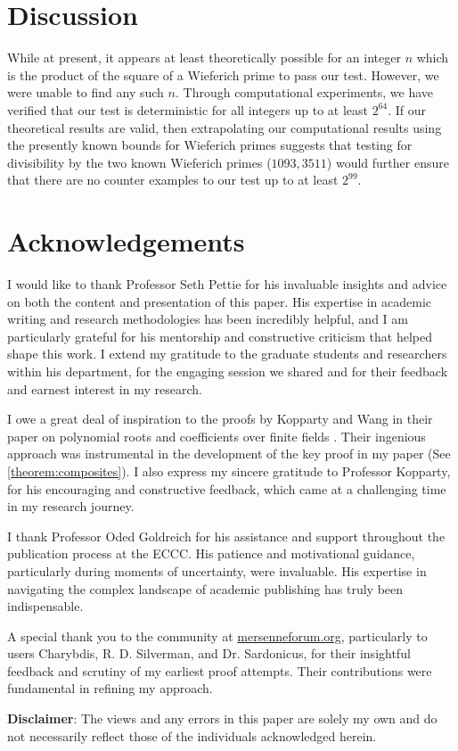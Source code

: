 \documentclass{article}
\theoremstyle{plain}
\theoremstyle{definition}
\begin{document}
\section{Discussion}
While at present, it appears at least theoretically possible for an integer $n$ which is the product of the square of a Wieferich prime to pass our test. However, we were unable to find any such $n$. Through computational experiments, we have verified that our test is deterministic for all integers up to at least $2^{64}$. If our theoretical results are valid, then extrapolating our computational results using the presently known bounds for Wieferich primes \cite{carella2018results} suggests that testing for divisibility by the two known Wieferich primes ($1093, 3511$) would further ensure that there are no counter examples to our test up to at least $2^{99}$.

\section{Acknowledgements}
I would like to thank Professor Seth Pettie for his invaluable insights and advice on both the content and presentation of this paper. His expertise in academic writing and research methodologies has been incredibly helpful, and I am particularly grateful for his mentorship and constructive criticism that helped shape this work. I extend my gratitude to the graduate students and researchers within his department, for the engaging session we shared and for their feedback and earnest interest in my research.

I owe a great deal of inspiration to the proofs by Kopparty and Wang in their paper on polynomial roots and coefficients over finite fields \cite{koppartywang2014roots}. Their ingenious approach was instrumental in the development of the key proof in my paper (See \cref{theorem:composites}). I also express my sincere gratitude to Professor Kopparty, for his encouraging and constructive feedback, which came at a challenging time in my research journey.

I thank Professor Oded Goldreich for his assistance and support throughout the publication process at the ECCC. His patience and motivational guidance, particularly during moments of uncertainty, were invaluable. His expertise in navigating the complex landscape of academic publishing has truly been indispensable.

A special thank you to the community at \url{mersenneforum.org}, particularly to users Charybdis, R. D. Silverman, and Dr. Sardonicus, for their insightful feedback and scrutiny of my earliest proof attempts. Their contributions were fundamental in refining my approach.

\textbf{Disclaimer}: The views and any errors in this paper are solely my own and do not necessarily reflect those of the individuals acknowledged herein.

\begingroup
\raggedright


\endgroup
\end{document}
